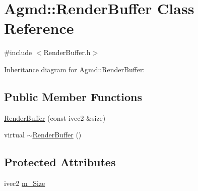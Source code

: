 \hypertarget{class_agmd_1_1_render_buffer}{\section{Agmd\+:\+:Render\+Buffer Class Reference}
\label{class_agmd_1_1_render_buffer}
}


{\ttfamily \#include $<$Render\+Buffer.\+h$>$}



Inheritance diagram for Agmd\+:\+:Render\+Buffer\+:
\subsection*{Public Member Functions}
\begin{DoxyCompactItemize}
\item 
\hyperlink{class_agmd_1_1_render_buffer_a6213bf44b8ad9f317972b11c8e5d9eb3}{Render\+Buffer} (const ivec2 \&size)
\item 
virtual \hyperlink{class_agmd_1_1_render_buffer_a49440e7526082e8028f0a03c8e068c4b}{$\sim$\+Render\+Buffer} ()
\end{DoxyCompactItemize}
\subsection*{Protected Attributes}
\begin{DoxyCompactItemize}
\item 
ivec2 \hyperlink{class_agmd_1_1_render_buffer_a92c5314800c8022d04b89c04625e2d93}{m\+\_\+\+Size}
\end{DoxyCompactItemize}


